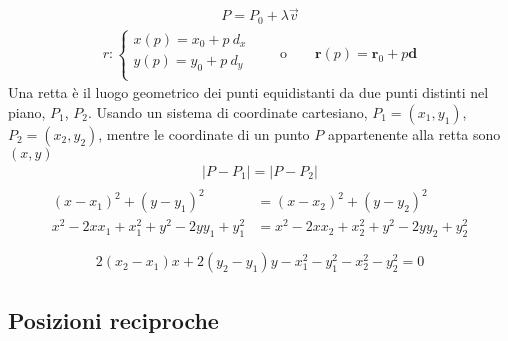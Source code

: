 \documentclass[letterpaper,10pt,english]{jupyterBook}
\begin{document}
\sphinxAtStartPar
{}
\begin{equation*}
\begin{split}P = P_0 + \lambda \overrightarrow{v}\end{split}
\end{equation*}\begin{equation*}
\begin{split}r: \begin{cases}
  x(p) = x_0 + p \ d_x \\
  y(p) = y_0 + p \ d_y \\
\end{cases}
\qquad \text{o} \qquad
  \mathbf{r}(p) = \mathbf{r}_0 + p \mathbf{d} 
\end{split}
\end{equation*}
\sphinxAtStartPar
{} Una retta è il luogo geometrico dei punti equidistanti da due punti distinti nel piano, \(P_1\), \(P_2\). Usando un sistema di coordinate cartesiano, \(P_1 = (x_1, y_1)\), \(P_2 = (x_2, y_2)\), mentre le coordinate di un punto \(P\) appartenente alla retta sono \((x,y)\)
\begin{equation*}
\begin{split}|P - P_1| = |P-P_2|\end{split}
\end{equation*}\begin{equation*}
\begin{split}\begin{aligned}
 (x - x_1)^2 + (y - y_1)^2 &=  (x - x_2)^2 + (y - y_2)^2 \\
 x^2 - 2 x x_1 + x_1^2 + y^2 - 2 y y_1 + y_1^2 &=  x^2 - 2 x x_2 + x_2^2 + y^2 - 2 y y_2 + y_2^2 \\
\end{aligned}\end{split}
\end{equation*}\begin{equation*}
\begin{split}  2 ( x_2 - x_1 ) x + 2 ( y_2 - y_1 ) y - x_1^2 - y_1^2 - x_2^2 - y_2^2 = 0 \end{split}
\end{equation*}

\subsection{Posizioni reciproche}
\label{\detokenize{ch/analytic_geometry/analytic_geometry_2d/lines:posizioni-reciproche}}
\end{document}
